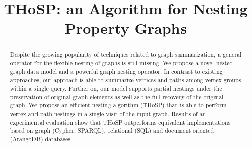 


\begin{abstract}
  Despite the growing popularity of techniques related to graph summarization, a general operator for the flexible nesting of graphs is still missing.
  We propose a novel nested graph data model and a powerful graph nesting operator. In contrast to existing approaches, our approach is able to summarize vertices and paths among vertex groups within a single query. Further on, our model supports partial nestings under the preservation of original graph elements as well as the full recovery of the original graph. We propose an efficient nesting algorithm (THoSP) that is able to perform vertex and path nestings in a single visit of the input graph. Results of an experimental evaluation show that THoSP outperforms equivalent implementations based on graph (Cypher, SPARQL), relational (SQL) and document oriented (ArangoDB) databases.
\end{abstract}


\title{THoSP: an Algorithm for Nesting Property Graphs}


